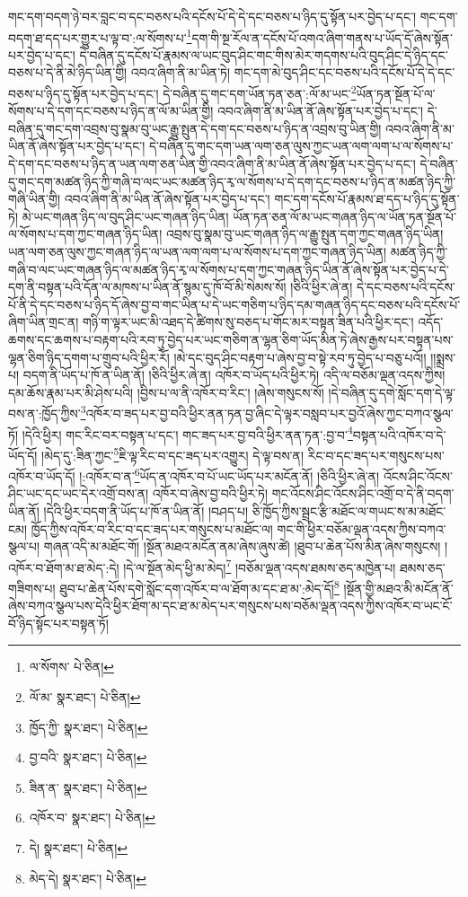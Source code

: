 གང་དག་བདག་ཉེ་བར་བླང་བ་དང་བཅས་པའི་དངོས་པོ་དེ་དེ་དང་བཅས་པ་ཉིད་དུ་སྟོན་པར་བྱེད་པ་དང་། གང་དག་བདག་ཐ་དད་པར་གྱུར་པ་ལྟ་བ་:ལ་སོགས་པ་\footnote{ལ་སོགས་  པེ་ཅིན། }དག་གི་སྔ་རོལ་ན་དངོས་པོ་འགའ་ཞིག་གནས་པ་ཡོད་དོ་ཞེས་སྟོན་པར་བྱེད་པ་དང་། དེ་བཞིན་དུ་དངོས་པོ་རྣམས་ལ་ཡང་བུད་ཤིང་གང་གིས་མེར་གདགས་པའི་བུད་ཤིང་དེ་ཉིད་དང་བཅས་པ་དེ་ནི་མེ་ཉིད་ཡིན་གྱི། འབའ་ཞིག་ནི་མ་ཡིན་ཏེ། གང་དག་མེ་བུད་ཤིང་དང་བཅས་པའི་དངོས་པོ་དེ་དེ་དང་བཅས་པ་ཉིད་དུ་སྟོན་པར་བྱེད་པ་དང་། དེ་བཞིན་དུ་གང་དག་ཡོན་ཏན་ཅན་:ལོ་མ་ཡང་\footnote{ལོ་མ་  སྣར་ཐང་།  པེ་ཅིན། }ཡོན་ཏན་སྔོན་པོ་ལ་སོགས་པ་དེ་དག་དང་བཅས་པ་ཉིད་ན་ལོ་མ་ཡིན་གྱི། འབའ་ཞིག་ནི་མ་ཡིན་ནོ་ཞེས་སྟོན་པར་བྱེད་པ་དང་། དེ་བཞིན་དུ་གང་དག་འབྲས་བུ་སྣམ་བུ་ཡང་རྒྱུ་སྤུན་དེ་དག་དང་བཅས་པ་ཉིད་ན་འབྲས་བུ་ཡིན་གྱི། འབའ་ཞིག་ནི་མ་ཡིན་ནོ་ཞེས་སྟོན་པར་བྱེད་པ་དང་། དེ་བཞིན་དུ་གང་དག་ཡན་ལག་ཅན་ལུས་ཀྱང་ཡན་ལག་ལག་པ་ལ་སོགས་པ་དེ་དག་དང་བཅས་པ་ཉིད་ན་ཡན་ལག་ཅན་ཡིན་གྱི་འབའ་ཞིག་ནི་མ་ཡིན་ནོ་ཞེས་སྟོན་པར་བྱེད་པ་དང་། དེ་བཞིན་དུ་གང་དག་མཚན་ཉིད་ཀྱི་གཞི་བ་ལང་ཡང་མཚན་ཉིད་རྭ་ལ་སོགས་པ་དེ་དག་དང་བཅས་པ་ཉིད་ན་མཚན་ཉིད་ཀྱི་གཞི་ཡིན་གྱི། འབའ་ཞིག་ནི་མ་ཡིན་ནོ་ཞེས་སྟོན་པར་བྱེད་པ་དང་། གང་དག་དངོས་པོ་རྣམས་ཐ་དད་པ་ཉིད་དུ་སྟོན་ཏེ། མེ་ཡང་གཞན་ཉིད་ལ་བུད་ཤིང་ཡང་གཞན་ཉིད་ཡིན། ཡོན་ཏན་ཅན་ལོ་མ་ཡང་གཞན་ཉིད་ལ་ཡོན་ཏན་སྔོན་པོ་ལ་སོགས་པ་དག་ཀྱང་གཞན་ཉིད་ཡིན། འབྲས་བུ་སྣམ་བུ་ཡང་གཞན་ཉིད་ལ་རྒྱུ་སྤུན་དག་ཀྱང་གཞན་ཉིད་ཡིན། ཡན་ལག་ཅན་ལུས་ཀྱང་གཞན་ཉིད་ལ་ཡན་ལག་ལག་པ་ལ་སོགས་པ་དག་ཀྱང་གཞན་ཉིད་ཡིན། མཚན་ཉིད་ཀྱི་གཞི་བ་ལང་ཡང་གཞན་ཉིད་ལ་མཚན་ཉིད་རྭ་ལ་སོགས་པ་དག་ཀྱང་གཞན་ཉིད་ཡིན་ནོ་ཞེས་སྟོན་པར་བྱེད་པ་དེ་དག་ནི་བསྟན་པའི་དོན་ལ་མཁས་པ་ཡིན་ནོ་སྙམ་དུ་ཁོ་བོ་མི་སེམས་སོ། །ཅིའི་ཕྱིར་ཞེ་ན། དེ་དང་བཅས་པའི་དངོས་པོ་ནི་དེ་དང་བཅས་པ་ཉིད་དོ་ཞེས་བྱ་བ་གང་ཡིན་པ་དེ་ཡང་གཅིག་པ་ཉིད་དམ་གཞན་ཉིད་དང་བཅས་པའི་དངོས་པོ་ཞིག་ཡིན་གྲང་ན། གཉི་ག་ལྟར་ཡང་མི་འཐད་དེ་ཚིགས་སུ་བཅད་པ་གོང་མར་བསྟན་ཟིན་པའི་ཕྱིར་དང་། འདོད་ཆགས་དང་ཆགས་པ་བརྟག་པའི་རབ་ཏུ་བྱེད་པར་ཡང་གཅིག་ན་ལྷན་ཅིག་ཡོད་མིན་ཏེ་ཞེས་རྒྱས་པར་བསྟན་པས་ལྷན་ཅིག་ཉིད་དགག་པ་གྲུབ་པའི་ཕྱིར་རོ། །མེ་དང་བུད་ཤིང་བརྟག་པ་ཞེས་བྱ་བ་སྟེ་རབ་ཏུ་བྱེད་པ་བཅུ་པའོ།། །།སྨྲས་པ། བདག་ནི་ཡོད་པ་ཁོ་ན་ཡིན་ནོ། །ཅིའི་ཕྱིར་ཞེ་ན། འཁོར་བ་ཡོད་པའི་ཕྱིར་ཏེ། འདི་ལ་བཅོམ་ལྡན་འདས་ཀྱིས། དམ་ཆོས་རྣམ་པར་མི་ཤེས་པའི། །བྱིས་པ་ལ་ནི་འཁོར་བ་རིང་། །ཞེས་གསུངས་སོ། །དེ་བཞིན་དུ་དགེ་སློང་དག་དེ་ལྟ་བས་ན་:ཁྱོད་ཀྱིས་\footnote{ཁྱོད་ཀྱི་  སྣར་ཐང་།  པེ་ཅིན། }འཁོར་བ་ཟད་པར་བྱ་བའི་ཕྱིར་ནན་ཏན་བྱ་ཞིང་དེ་ལྟར་བསླབ་པར་བྱའོ་ཞེས་ཀྱང་བཀའ་སྩལ་ཏོ། །དེའི་ཕྱིར། གང་རིང་བར་བསྟན་པ་དང་། གང་ཟད་པར་བྱ་བའི་ཕྱིར་ནན་ཏན་:བྱ་བ་\footnote{བྱ་བའི་  སྣར་ཐང་།  པེ་ཅིན། }བསྟན་པའི་འཁོར་བ་དེ་ཡོད་དོ། །མེད་དུ་:ཟིན་ཀྱང་\footnote{ཟིན་ན་  སྣར་ཐང་།  པེ་ཅིན། }ཇི་ལྟ་རིང་བ་དང་ཟད་པར་འགྱུར། དེ་ལྟ་བས་ན། རིང་བ་དང་ཟད་པར་གསུངས་པས་འཁོར་བ་ཡོད་དོ། །:འཁོར་བ་ན་\footnote{འཁོར་བ་  སྣར་ཐང་།  པེ་ཅིན། }ཡོད་ན་འཁོར་བ་པོ་ཡང་ཡོད་པར་མངོན་ནོ། །ཅིའི་ཕྱིར་ཞེ་ན། འོངས་ཤིང་འོངས་ཤིང་ཡང་དང་ཡང་དེར་འགྲོ་བས་ན། འཁོར་བ་ཞེས་བྱ་བའི་ཕྱིར་ཏེ། གང་འོངས་ཤིང་འོངས་ཤིང་འགྲོ་བ་དེ་ནི་བདག་ཡིན་ནོ། །དེའི་ཕྱིར་བདག་ནི་ཡོད་པ་ཁོ་ན་ཡིན་ནོ། །བཤད་པ། ཅི་ཁྱོད་ཀྱིས་སྦྲང་རྩི་མཐོང་ལ་གཡང་ས་མ་མཐོང་ངམ། ཁྱོད་ཀྱིས་འཁོར་བ་རིང་བ་དང་ཟད་པར་གསུངས་པ་མཐོང་ལ། གང་གི་ཕྱིར་བཅོམ་ལྡན་འདས་ཀྱིས་བཀའ་སྩལ་པ། གཞན་འདི་མ་མཐོང་གོ། །སྔོན་མཐའ་མངོན་ནམ་ཞེས་ཞུས་ཚེ། །ཐུབ་པ་ཆེན་པོས་མིན་ཞེས་གསུངས། །འཁོར་བ་ཐོག་མ་ཐ་མེད་:དེ། །དེ་ལ་སྔོན་མེད་ཕྱི་མ་མེད།\footnote{དེ།  སྣར་ཐང་།  པེ་ཅིན། } །བཅོམ་ལྡན་འདས་ཐམས་ཅད་མཁྱེན་པ། ཐམས་ཅད་གཟིགས་པ། ཐུབ་པ་ཆེན་པོས་དགེ་སློང་དག་འཁོར་བ་ལ་ཐོག་མ་དང་ཐ་མ་:མེད་དོ།\footnote{མེད་དེ།  སྣར་ཐང་།  པེ་ཅིན། } །སྔོན་གྱི་མཐའ་མི་མངོན་ནོ་ཞེས་བཀའ་སྩལ་པས་དེའི་ཕྱིར་ཐོག་མ་དང་ཐ་མ་མེད་པར་གསུངས་པས་བཅོམ་ལྡན་འདས་ཀྱིས་འཁོར་བ་ཡང་ངོ་བོ་ཉིད་སྟོང་པར་བསྟན་ཏོ། 